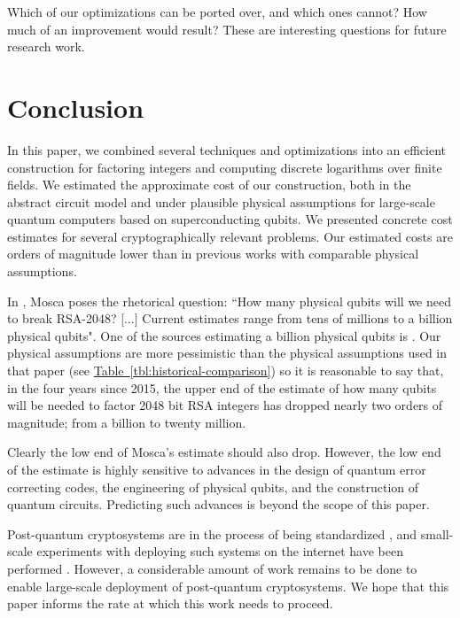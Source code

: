\documentclass[a4paper, onecolumn, accepted=2021-03-29]{quantumarticle}
\newcommand{\tbl}[1]{\hyperref[tbl:#1]{Table~\ref*{tbl:#1}}}
\begin{document}
Which of our optimizations can be ported over, and which ones cannot?
How much of an improvement would result?
These are interesting questions for future research work.




\section{Conclusion}
\label{sec:conclusion}

In this paper, we combined several techniques and optimizations into an efficient construction for factoring integers and computing discrete logarithms over finite fields.
We estimated the approximate cost of our construction, both in the abstract circuit model and under plausible physical assumptions for large-scale quantum computers based on superconducting qubits.
We presented concrete cost estimates for several cryptographically relevant problems.
Our estimated costs are orders of magnitude lower than in previous works with comparable physical assumptions.

In \cite{mosca2018cybersecurity}, Mosca poses the rhetorical question: ``How many physical qubits will we need to break RSA-2048? [...] Current estimates range from tens of millions to a billion physical qubits".
One of the sources estimating a billion physical qubits is \cite{fowler2012surfacecodereview}.
Our physical assumptions are more pessimistic than the physical assumptions used in that paper (see \tbl{historical-comparison}) so it is reasonable to say that, in the four years since 2015, the upper end of the estimate of how many qubits will be needed to factor 2048 bit RSA integers has dropped nearly two orders of magnitude; from a billion to twenty million.

Clearly the low end of Mosca's estimate should also drop.
However, the low end of the estimate is highly sensitive to advances in the design of quantum error correcting codes, the engineering of physical qubits, and the construction of quantum circuits.
Predicting such advances is beyond the scope of this paper.

Post-quantum cryptosystems are in the process of being standardized \cite{alagic2019status}, and small-scale experiments with deploying such systems on the internet have been performed \cite{google2016postquantum}.
However, a considerable amount of work remains to be done to enable large-scale deployment of post-quantum cryptosystems.
We hope that this paper informs the rate at which this work needs to proceed.
\end{document}

